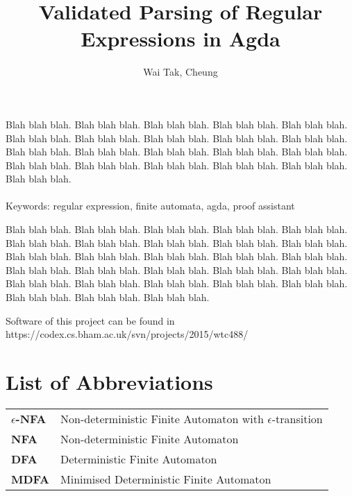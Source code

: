 \documentclass[twoside,openright,final]{bhamthesis}
\title{\textbf{Validated Parsing of Regular Expressions in Agda}}
\author{Wai Tak, Cheung}
\begin{document}
\maketitle

\abstract
\par Blah blah blah. Blah blah blah. Blah blah blah. Blah blah blah. Blah
blah blah. Blah blah blah. Blah blah blah. Blah blah blah.
Blah blah blah. Blah blah blah. Blah blah blah. Blah blah blah. Blah
blah blah.
Blah blah blah. Blah blah blah. Blah blah blah. Blah blah blah.
Blah blah blah. Blah blah blah. Blah blah blah. Blah blah blah. \\ \\
Keywords: regular expression, finite automata, agda, proof assistant

\acknowledgments
\par Blah blah blah. Blah blah blah. Blah blah blah. Blah blah blah. Blah
blah blah. Blah blah blah. Blah blah blah.
Blah blah blah. Blah blah blah. Blah blah blah.
Blah blah blah. Blah blah blah. Blah blah blah. Blah blah blah. Blah
blah blah. Blah blah blah. Blah blah blah.
Blah blah blah. Blah blah blah. Blah blah blah. Blah blah blah. Blah
blah blah. Blah blah blah.
Blah blah blah. Blah blah blah. Blah blah blah. Blah blah blah. Blah
blah blah.

\repository
\vspace{7cm}
\begin{center}
  Software of this project can be found in \\
  https://codex.cs.bham.ac.uk/svn/projects/2015/wtc488/
\end{center}

\newpage
\section*{List of Abbreviations}
\begin{tabular}{ll}
  \textbf{\(\epsilon\)-NFA} & Non-deterministic Finite Automaton with
                              \(\epsilon\)-transition \\
  \textbf{NFA} & Non-deterministic Finite Automaton \\
  \textbf{DFA} & Deterministic Finite Automaton \\
  \textbf{MDFA} & Minimised Deterministic Finite Automaton
\end{tabular}
\newpage

\newpage
\setcounter{tocdepth}{3}
\tableofcontents
\end{document}
